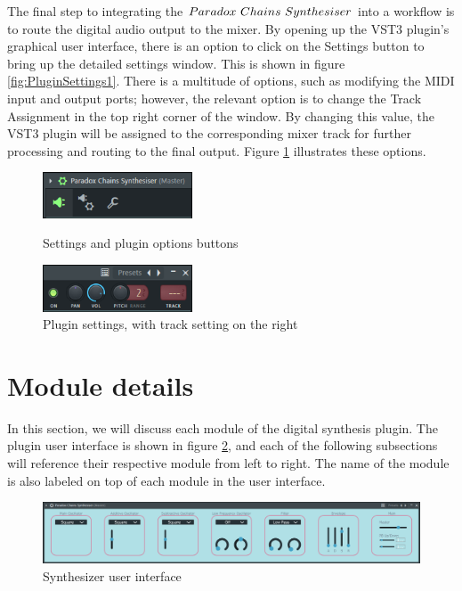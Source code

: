 \documentclass[a4paper,12pt]{report}
\begin{document}
The final step to integrating the $Paradox\ \-Chains\ \-Synthesiser$ into a workflow is to route the digital audio output to the mixer. By opening up the VST3 plugin's graphical user interface, there is an option to click on the Settings button to bring up the detailed settings window. This is shown in figure \ref{fig:PluginSettings1}. There is a multitude of options, such as modifying the MIDI input and output ports; however, the relevant option is to change the Track Assignment in the top right corner of the window. By changing this value, the VST3 plugin will be assigned to the corresponding mixer track for further processing and routing to the final output. Figure \ref{fig:PluginSettings2} illustrates these options.

\begin{figure}[h]
    \centering
    \includegraphics[width=12em]{PluginSettings1.png}
    \caption{Settings and plugin options buttons}
    \label{fig:PluginSettings1}
    \includegraphics[width=12em]{PluginSettings2.png}
    \caption{Plugin settings, with track setting on the right}
    \label{fig:PluginSettings2}
\end{figure}

\section{Module details}
\label{sec:moduledetails}
In this section, we will discuss each module of the digital synthesis plugin. The plugin user interface is shown in figure \ref{fig:OverallScreenshot}, and each of the following subsections will reference their respective module from left to right. The name of the module is also labeled on top of each module in the user interface.

\begin{figure}
    \centering
    \includegraphics[width=36em]{OverallScreenshot.png}
    \caption{Synthesizer user interface}
    \label{fig:OverallScreenshot}
\end{figure}
\end{document}
